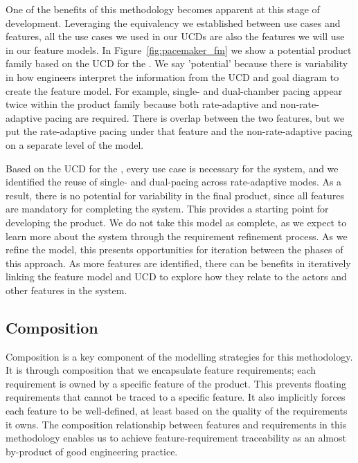 One of the benefits of this methodology becomes apparent at this stage of development. Leveraging the equivalency we established between use cases and features, all the use cases we used in our UCDs are also the features we will use in our feature models. In Figure~\ref{fig:pacemaker_fm} we show a potential product family based on the UCD for the \pgd. We say 'potential' because there is variability in how engineers interpret the information from the UCD and goal diagram to create the feature model. For example, single- and dual-chamber pacing appear twice within the product family because both rate-adaptive and non-rate-adaptive pacing are required. There is overlap between the two features, but we put the rate-adaptive pacing under that feature and the non-rate-adaptive pacing on a separate level of the model.

Based on the UCD for the \pgd, every use case is necessary for the system, and we identified the reuse of single- and dual-pacing across rate-adaptive modes. As a result, there is no potential for variability in the final product, since all features are mandatory for completing the system. This provides a starting point for developing the product. We do not take this model as complete, as we expect to learn more about the system through the requirement refinement process. As we refine the model, this presents opportunities for iteration between the phases of this approach. As more features are identified, there can be benefits in iteratively linking the feature model and \gls{UCD} to explore how they relate to the actors and other features in the system.


\subsection{Composition}

Composition is a key component of the modelling strategies for this methodology. It is through composition that we encapsulate feature requirements; each requirement is owned by a specific feature of the product. This prevents floating requirements that cannot be traced to a specific feature. It also implicitly forces each feature to be well-defined, at least based on the quality of the requirements it owns. The composition relationship between features and requirements in this methodology enables us to achieve feature-requirement traceability as an almost by-product of good engineering practice.

